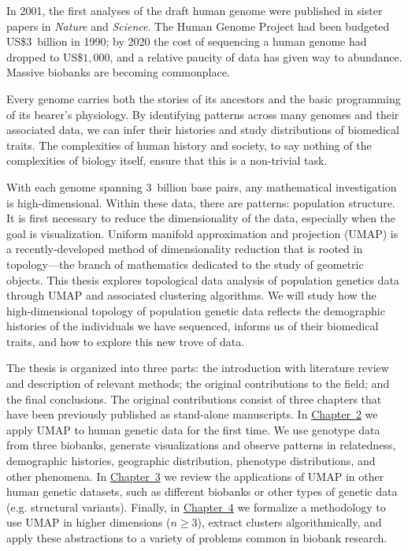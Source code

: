 In 2001, the first analyses of the draft human genome were published in sister papers in \textit{Nature} and \textit{Science}. The Human Genome Project had been budgeted US\$$3$~billion in 1990; by 2020 the cost of sequencing a human genome had dropped to US\$$1,000$, and a relative paucity of data has given way to abundance\citep{gibbs_human_2020}. Massive biobanks are becoming commonplace.

Every genome carries both the stories of its ancestors and the basic programming of its bearer's physiology. By identifying patterns across many genomes and their associated data, we can infer their histories and study distributions of biomedical traits. The complexities of human history and society, to say nothing of the complexities of biology itself, ensure that this is a non-trivial task.

With each genome spanning $3$~billion base pairs, any mathematical investigation is high-dimensional. Within these data, there are patterns: population structure. It is first necessary to reduce the dimensionality of the data, especially when the goal is visualization. Uniform manifold approximation and projection (UMAP) is a recently-developed method of dimensionality reduction that is rooted in topology---the branch of mathematics dedicated to the study of geometric objects. This thesis explores topological data analysis of population genetics data through UMAP and associated clustering algorithms. We will study how the high-dimensional topology of population genetic data reflects the demographic histories of the individuals we have sequenced, informs us of their biomedical traits, and how to explore this new trove of data.

The thesis is organized into three parts: the introduction with literature review and description of relevant methods; the original contributions to the field; and the final conclusions. The original contributions consist of three chapters that have been previously published as stand-alone manuscripts. In \hyperref[chap:chapter2]{Chapter~2} we apply UMAP to human genetic data for the first time. We use genotype data from three biobanks, generate visualizations and observe patterns in relatedness, demographic histories, geographic distribution, phenotype distributions, and other phenomena. In \hyperref[chap:chapter3]{Chapter~3} we review the applications of UMAP in other human genetic datasets, such as different biobanks or other types of genetic data (e.g. structural variants). Finally, in \hyperref[chap:chapter4]{Chapter~4} we formalize a methodology to use UMAP in higher dimensions ($n \ge 3$), extract clusters algorithmically, and apply these abstractions to a variety of problems common in biobank research.

